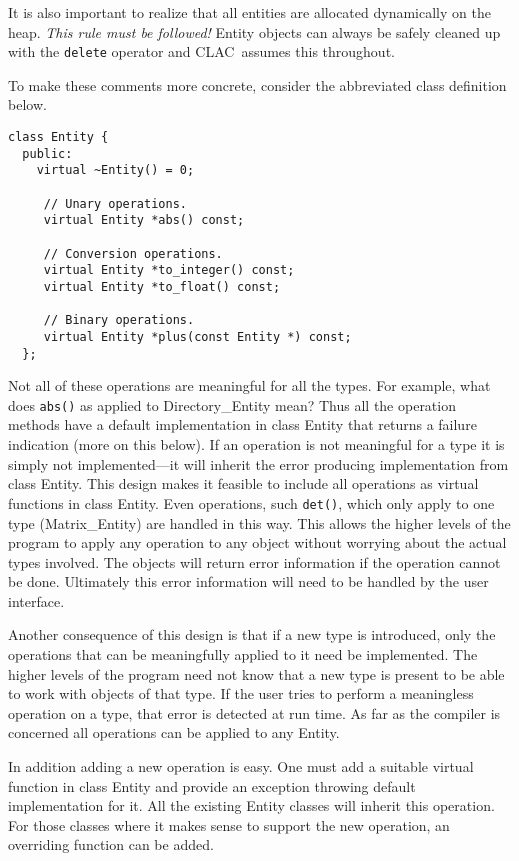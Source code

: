 \documentclass{report}
\newcommand{\CLAC}{CLAC}
\begin{document}
It is also important to realize that all entities are allocated dynamically on the heap. \emph{This rule must be followed!} Entity objects can always be safely cleaned up with the \texttt{delete} operator and \CLAC\ assumes this throughout.

To make these comments more concrete, consider the abbreviated class definition below.

\begin{verbatim}
class Entity {
  public:
    virtual ~Entity() = 0;

     // Unary operations.
     virtual Entity *abs() const;

     // Conversion operations.
     virtual Entity *to_integer() const;
     virtual Entity *to_float() const;

     // Binary operations.
     virtual Entity *plus(const Entity *) const;
  };
\end{verbatim}

Not all of these operations are meaningful for all the types. For example, what does \texttt{abs()} as applied to Directory\_Entity mean? Thus all the operation methods have a default implementation in class Entity that returns a failure indication (more on this below). If an operation is not meaningful for a type it is simply not implemented---it will inherit the error producing implementation from class Entity. This design makes it feasible to include all operations as virtual functions in class Entity. Even operations, such \texttt{det()}, which only apply to one type (Matrix\_Entity) are handled in this way. This allows the higher levels of the program to apply any operation to any object without worrying about the actual types involved. The objects will return error information if the operation cannot be done. Ultimately this error information will need to be handled by the user interface.

Another consequence of this design is that if a new type is introduced, only the operations that can be meaningfully applied to it need be implemented. The higher levels of the program need not know that a new type is present to be able to work with objects of that type. If the user tries to perform a meaningless operation on a type, that error is detected at run time. As far as the compiler is concerned all operations can be applied to any Entity.

In addition adding a new operation is easy. One must add a suitable virtual function in class Entity and provide an exception throwing default implementation for it. All the existing Entity classes will inherit this operation. For those classes where it makes sense to support the new operation, an overriding function can be added.
\end{document}
